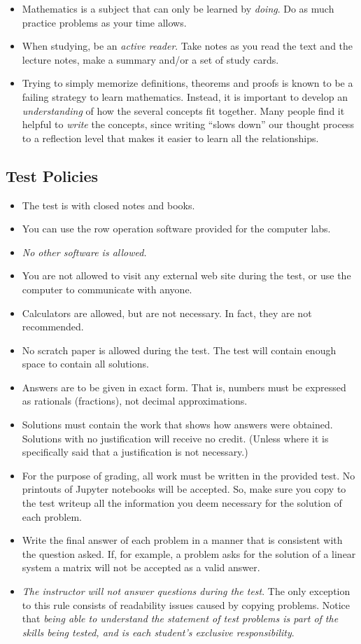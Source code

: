 \documentclass[12pt]{article}
\begin{document}
\begin{itemize}
\item Mathematics is a subject that can only be learned by \emph{doing}. Do as much practice problems as your time allows.
\item When studying, be an \emph{active reader}. Take notes as you read the text and the lecture notes, make a summary and/or a set of study cards.
\item Trying to simply memorize definitions, theorems and proofs is known to be a failing strategy to learn mathematics. Instead, it is important to develop an \emph{understanding} of how the several concepts fit together. Many people find it helpful to \emph{write} the concepts, since writing ``slows down'' our thought process to a reflection level that makes it easier to learn all the relationships.
\end{itemize}

\subsection{Test Policies}

\begin{itemize}
\item The test is with closed notes and books.
\item You can use the row operation software provided for the computer labs.
\item \emph{No other software is allowed.}
\item You are not allowed to visit any external web site during the test, or use the computer to communicate with anyone.
\item Calculators are allowed, but are not necessary. In fact, they are not recommended.
\item No scratch paper is allowed during the test. The test will contain enough space to contain all solutions.
\item Answers are to be given in exact form. That is, numbers must be expressed as rationals (fractions), not decimal approximations.
\item Solutions must contain the work that shows how answers were obtained. Solutions with no justification will receive no credit. (Unless where it is specifically said that a justification is not necessary.)
\item For the purpose of grading, all work must be written in the provided test. No printouts of Jupyter notebooks will be accepted. So, make sure you copy to the test writeup all the information you deem necessary for the solution of each problem.
\item Write the final answer of each problem in a manner that is consistent with the question asked. If, for example, a problem asks for the solution of a linear system a matrix will not be accepted as a valid answer.
\item \emph{The instructor will not answer questions during the test}. The only exception to this rule consists of readability issues caused by copying problems. Notice that \emph{being able to understand the statement of test problems is part of the skills being tested, and is each student's exclusive responsibility}.
\end{itemize}
\end{document}
